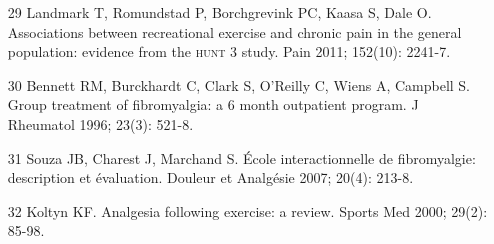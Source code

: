 \documentclass{article}
\begin{document}
\begin{itemize}
\item[29] Landmark T, Romundstad P, Borchgrevink PC, Kaasa S, Dale O.
Associations between recreational exercise and chronic pain in the general
population: evidence from the \textsc{hunt} 3 study. Pain 2011; 152(10): 2241-7.

\item[30] Bennett RM, Burckhardt C, Clark S, O'Reilly C, Wiens A, Campbell
S. Group treatment of fibromyalgia: a 6 month outpatient program. J Rheumatol
1996; 23(3): 521-8.

\item[31] Souza JB, Charest J, Marchand S. École interactionnelle de
fibromyalgie: description et évaluation. Douleur et Analgésie 2007; 20(4):
213-8.

\item[32] Koltyn KF. Analgesia following exercise: a review. Sports Med
2000; 29(2): 85-98.

\end{itemize}
\end{document}
